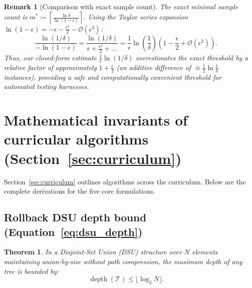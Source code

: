 \documentclass[11pt, letterpaper]{article}
\newtheorem{theorem}{Theorem}[section]
\newtheorem{remark}{Remark}[section]
\begin{document}
\begin{remark}[Comparison with exact sample count]
The exact minimal sample count is $m^* \coloneqq \left\lceil \frac{\ln \delta}{\ln(1 - \epsilon)} \right\rceil$. 
Using the Taylor series expansion $\ln(1 - \epsilon) = -\epsilon - \frac{\epsilon^2}{2} - \mathcal{O}(\epsilon^3)$:
\begin{equation}
    \frac{\ln(1/\delta)}{-\ln(1 - \epsilon)} = \frac{\ln(1/\delta)}{\epsilon + \frac{\epsilon^2}{2} + \dots} = \frac{1}{\epsilon} \ln\left(\frac{1}{\delta}\right) \left( 1 - \frac{\epsilon}{2} + \mathcal{O}(\epsilon^2) \right).
\end{equation}
Thus, our closed-form estimate $\frac{1}{\epsilon} \ln(1/\delta)$ overestimates the exact threshold by a relative factor of approximately $1 + \frac{\epsilon}{2}$ (an additive difference of $\approx \frac{1}{2} \ln \frac{1}{\delta}$ instances), providing a safe and computationally convenient threshold for automated testing harnesses.
\end{remark}

\section{Mathematical invariants of curricular algorithms (\texorpdfstring{Section~\ref{sec:curriculum}}{Section 4})}
Section~\ref{sec:curriculum} outlines algorithms across the curriculum. Below are the complete derivations for the five core formulations.

\subsection{Rollback DSU depth bound (\texorpdfstring{Equation~\ref{eq:dsu_depth}}{Eq. 7})}
\begin{theorem}
In a Disjoint-Set Union (DSU) structure over $N$ elements maintaining union-by-size without path compression, the maximum depth of any tree is bounded by:
\begin{equation}
    \operatorname{depth}(\mathcal{T}) \le \lfloor \log_2 N \rfloor.
\end{equation}
\end{theorem}
\end{document}
